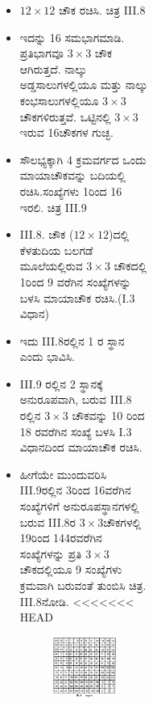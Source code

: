 \begin{figure}[H]
\begin{figure}[H]
\begin{figure}[h]
\begin{figure}[h]
\begin{itemize}
	\item $12 \times 12$ ಚೌಕ ರಚಿಸಿ. ಚಿತ್ರ  III.8
	\item ಇದನ್ನು 16 ಸಮಭಾಗಮಾಡಿ. ಪ್ರತಿಭಾಗವೂ $3 \times 3$ ಚೌಕ ಆಗಿರುತ್ತದೆ. ನಾಲ್ಕು ಅಡ್ಡಸಾಲುಗಳಲ್ಲಿಯೂ ಮತ್ತು ನಾಲ್ಕು ಕಂಭಸಾಲುಗಳಲ್ಲಿಯೂ $3 \times 3$ ಚೌಕಗಳಿರುತ್ತವೆ. ಒಟ್ಟಿನಲ್ಲಿ $3 \times 3$ ಇರುವ 16ಚೌಕಗಳ ಗುಚ್ಛ.
	\item ಸೌಲಭ್ಯಕ್ಕಾಗಿ 4 ಕ್ರಮವರ್ಗದ ಒಂದು ಮಾಯಾಚೌಕವನ್ನು ಬದಿಯಲ್ಲಿ ರಚಿಸಿ.\break ಸಂಖ್ಯೆಗಳು 1ರಿಂದ 16 ಇರಲಿ. ಚಿತ್ರ  III.9
	\item III.8. ಚೌಕ ($12 \times 12$)ದಲ್ಲಿ ಕೆಳತುದಿಯ ಬಲಗಡೆ ಮೂಲೆಯಲ್ಲಿರುವ $3 \times 3$ ಚೌಕದಲ್ಲಿ 1ರಿಂದ 9 ವರೆಗಿನ ಸಂಖ್ಯೆಗಳನ್ನು ಬಳಸಿ ಮಾಯಾಚೌಕ ರಚಿಸಿ.\break (I.3 ವಿಧಾನ)
	\item ಇದು  III.8ರಲ್ಲಿನ 1 ರ ಸ್ಥಾನ ಎಂದು ಭಾವಿಸಿ.
	\item III.9 ರಲ್ಲಿನ 2 ಸ್ಥಾನಕ್ಕೆ ಅನುರೂಪವಾಗಿ, ಬರುವ  III.8 ರಲ್ಲಿನ $3 \times 3$ ಚೌಕವನ್ನು 10 ರಿಂದ 18 ರವರೆಗಿನ ಸಂಖ್ಯೆ ಬಳಸಿ I.3 ವಿಧಾನದಿಂದ ಮಾಯಾಚೌಕ ರಚಿಸಿ.

	\item ಹೀಗೆಯೇ ಮುಂದುವರಿಸಿ  III.9ರಲ್ಲಿನ 3ರಿಂದ 16ವರೆಗಿನ ಸಂಖ್ಯೆಗಳಿಗೆ ಅನುರೂಪಸ್ಥಾನಗಳಲ್ಲಿ ಬರುವ  III.8ರ $3 \times 3$ಚೌಕಗಳಲ್ಲಿ 19ರಿಂದ 144ರವರೆಗಿನ ಸಂಖ್ಯೆಗಳನ್ನು ಪ್ರತಿ $3 \times 3$ ಚೌಕದಲ್ಲಿಯೂ 9 ಸಂಖ್ಯೆಗಳು ಕ್ರಮವಾಗಿ ಬರುವಂತೆ ತುಂಬಿಸಿ ಚಿತ್ರ. III.8ನೋಡಿ.
<<<<<<< HEAD
	\begin{figure}[h]
	\includegraphics{src/figures/chap3/fig3-35.jpg}
	\end{figure}


\end{itemize}
\end{figure}
\end{figure}
\end{figure}
\end{figure}
